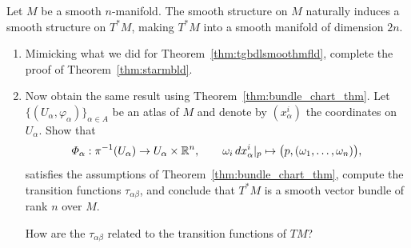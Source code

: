 \begin{theorem}\label{thm:starmbld}
	Let $M$ be a smooth $n$-manifold.
	The smooth structure on $M$ naturally induces a smooth structure on $T^*M$, making $T^*M$ into a smooth manifold of dimension $2n$.
\end{theorem}
\begin{exercise}\label{exe:prooftstarmbld}
	\begin{enumerate}
		\item Mimicking what we did for Theorem~\ref{thm:tgbdlsmoothmfld}, complete the proof of Theorem~\ref{thm:starmbld}.
		\item Now obtain the same result using Theorem~\ref{thm:bundle_chart_thm}.
      Let $\{(U_\alpha,\varphi_\alpha)\}_{\alpha\in A}$ be an atlas of $M$ and denote by $(x_\alpha^i)$ the coordinates on $U_\alpha$.
      Show that
      \begin{equation}
	      \varPhi_\alpha : \pi^{-1}(U_\alpha) \to U_\alpha\times\mathbb{R}^n, \qquad
	      \omega_i \, dx_\alpha^i|_p \mapsto \big(p, (\omega_1, \ldots, \omega_n)\big),
      \end{equation}
      satisfies the assumptions of Theorem~\ref{thm:bundle_chart_thm}, compute the transition functions $\tau_{\alpha\beta}$, and conclude that $T^*M$ is a smooth vector bundle of rank $n$ over $M$.

      How are the $\tau_{\alpha\beta}$ related to the transition functions of $TM$?
	\end{enumerate}
\end{exercise}

